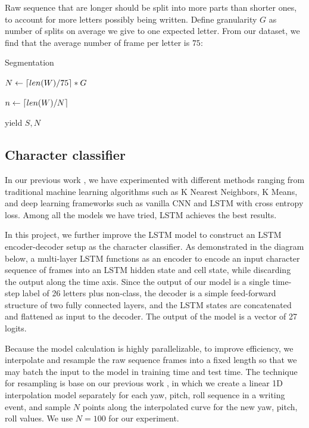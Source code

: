 \documentclass{article}
\DeclarePairedDelimiter{\ceil}{\lceil}{\rceil}
\begin{document}
\begin{multicols*}{2}
Raw sequence that are longer should be split into more parts than shorter ones, to account for more letters possibly being written. Define granularity $G$ as number of splits on average we give to one expected letter. From our dataset, we find that the average number of frame per letter is $75$:

\begin{algorithm}[H]
\SetAlgoLined
\caption{Segmentation}

$N \gets \ceil{len(W) / 75} * G $

$n \gets \ceil{len(W) / N} $


yield $S,N$
\end{algorithm}

\subsection{Character classifier}
In our previous work \cite{ours}, we have experimented with different methods ranging from traditional machine learning algorithms such as K Nearest Neighbors\cite{knn}, K Means\cite{kmeans}, and deep learning frameworks such as vanilla CNN\cite{lenet} and LSTM\cite{lstm} with cross entropy loss. Among all the models we have tried, LSTM achieves the best results. 

In this project, we further improve the LSTM model to construct an LSTM encoder-decoder setup as the character classifier. As demonstrated in the diagram below, a multi-layer LSTM functions as an encoder to encode an input character sequence of frames into an LSTM hidden state and cell state, while discarding the output along the time axis. Since the output of our model is a single time-step label of 26 letters plus non-class, the decoder is a simple feed-forward structure of two fully connected layers, and the LSTM states are concatenated and flattened as input to the decoder. The output of the model is a vector of 27 logits.

Because the model calculation is highly parallelizable, to improve efficiency, we interpolate and resample the raw sequence frames into a fixed length so that we may batch the input to the model in training time and test time. The technique for resampling is base on our previous work \cite{ours}, in which we create a linear 1D interpolation model separately for each yaw, pitch, roll sequence in a writing event, and sample $N$ points along the interpolated curve for the new yaw, pitch, roll values. We use $N=100$ for our experiment.


\end{multicols*}
\end{document}

